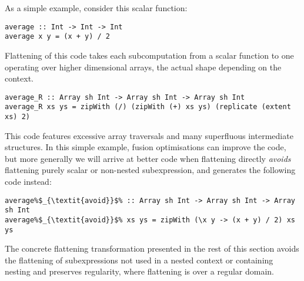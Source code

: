 As a simple example, consider this scalar function:
%
\begin{lstlisting}
average :: Int -> Int -> Int
average x y = (x + y) / 2
\end{lstlisting}
%
Flattening of this code takes each subcomputation from a scalar function to one operating over higher dimensional arrays, the actual shape depending on the context.
%
\begin{lstlisting}[style=ndp]
average_R :: Array sh Int -> Array sh Int -> Array sh Int
average_R xs ys = zipWith (/) (zipWith (+) xs ys) (replicate (extent xs) 2)
\end{lstlisting}
%
This code features excessive array traversals and many superfluous intermediate structures. In this simple example, fusion optimisations can improve the code, but more generally we will arrive at better code when flattening directly \emph{avoids} flattening purely scalar or non-nested subexpression, and generates the following code instead:
%
\begin{lstlisting}
average%$_{\textit{avoid}}$% :: Array sh Int -> Array sh Int -> Array sh Int
average%$_{\textit{avoid}}$% xs ys = zipWith (\x y -> (x + y) / 2) xs ys
\end{lstlisting}

The concrete flattening transformation presented in the rest of this section avoids the flattening of subexpressions not used in a nested context or containing nesting and preserves regularity, where flattening is over a regular domain.






